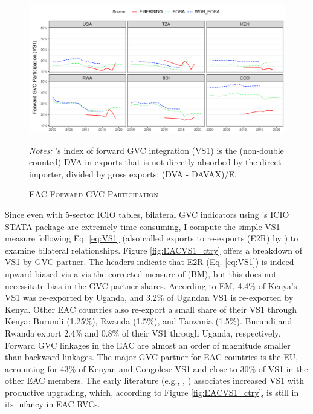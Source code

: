 \documentclass[a4paper]{article}
\begin{document}
\begin{figure}[h!] 
\centering
\caption{\label{fig:EAC_E2R_ag_ts}\textsc{EAC Forward GVC Participation}}
\includegraphics[width=1\textwidth]{"Figures/GVCF_shares_ag_ts.pdf"} \\ \raggedright
\scriptsize
\emph{Notes:} \citet{borin2019measuring}'s index of forward GVC integration (VS1) is the (non-double counted) DVA in exports that is not directly absorbed by the direct importer, divided by gross exports: (DVA - DAVAX)/E. 
\end{figure}
\FloatBarrier

Since even with 5-sector ICIO tables, bilateral GVC indicators using \citet{belotti2020icio}'s ICIO STATA package are extremely time-consuming, I compute the simple VS1 measure following Eq. \ref{eq:VS1} (also called exports to re-exports (E2R) by \citet{baldwin2015supply}) to examine bilateral relationships. Figure \ref{fig:EACVS1_ctry} offers a breakdown of VS1 by GVC partner. The headers indicate that E2R (Eq. \ref{eq:VS1}) is indeed upward biased vis-a-vis the corrected measure of \citet{borin2019measuring} (BM), but this does not necessitate bias in the GVC partner shares. According to EM, 4.4\% of Kenya's VS1 was re-exported by Uganda, and 3.2\% of Ugandan VS1 is re-exported by Kenya. Other EAC countries also re-export a small share of their VS1 through Kenya: Burundi (1.25\%), Rwanda (1.5\%), and Tanzania (1.5\%). Burundi and Rwanda export 2.4\% and 0.8\% of their VS1 through Uganda, respectively. Forward GVC linkages in the EAC are almost an order of magnitude smaller than backward linkages. The major GVC partner for EAC countries is the EU, accounting for 43\% of Kenyan and Congolese VS1 and close to 30\% of VS1 in the other EAC members. The early literature (e.g., \citet{foster2015global}, \citet{Kummritz20161}) associates increased VS1 with productive upgrading, which, according to Figure \ref{fig:EACVS1_ctry}, is still in its infancy in EAC RVCs. \newline
\end{document}
